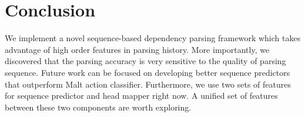\section{Conclusion}
We implement a novel sequence-based dependency parsing
framework which takes advantage of high order features 
in parsing history. 
More importantly, we discovered that the parsing accuracy is very sensitive to
the quality of parsing sequence. Future work can be focused on
developing better sequence predictors that outperform Malt action classifier.
Furthermore, we use two sets of features for sequence predictor and
head mapper right now. A unified set of features between these two components
are worth exploring.
%
%

